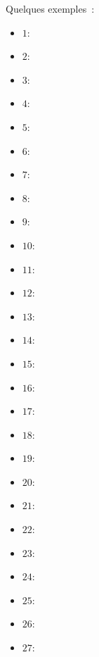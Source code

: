 Quelques exemples : 
\begin{multicols}{3}
\begin{itemize}[nosep]
    \item $1$: 
    \item $2$: 
    \item $3$: 
    \item $4$: 
    \item $5$: 
    \item $6$: 
    \item $7$: 
    \item $8$: 
    \item $9$: 
    \item $10$: 
    \item $11$: 
    \item $12$: 
    \item $13$: 
    \item $14$: 
    \item $15$: 
    \item $16$: 
    \item $17$: 
    \item $18$: 
    \item $19$: 
    \item $20$: 
    \item $21$: 
    \item $22$: 
    \item $23$: 
    \item $24$: 
    \item $25$: 
    \item $26$: 
    \item $27$: 
\end{itemize}
\end{multicols}

